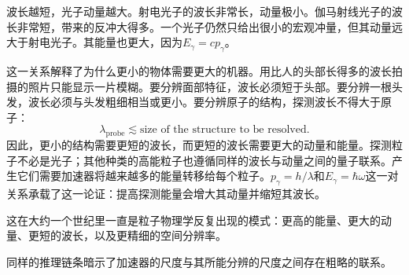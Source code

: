 \begin{classroomqa}
\end{classroomqa}

波长越短，光子动量越大。射电光子的波长非常长，动量极小。伽马射线光子的波长非常短，带来的反冲大得多。一个光子仍然只给出很小的宏观冲量，但其动量远大于射电光子。其能量也更大，因为\(E_\gamma=cp_\gamma\)。

这一关系解释了为什么更小的物体需要更大的机器。用比人的头部长得多的波长拍摄的照片只能显示一片模糊。要分辨面部特征，波长必须短于头部。要分辨一根头发，波长必须与头发粗细相当或更小。要分辨原子的结构，探测波长不得大于原子：
\begin{equation}
\lambda_{\mathrm{probe}}\lesssim
\text{size of the structure to be resolved}.
\end{equation}
因此，更小的结构需要更短的波长，而更短的波长需要更大的动量和能量。探测粒子不必是光子；其他种类的高能粒子也遵循同样的波长与动量之间的量子联系。产生它们需要加速器将越来越多的能量转移给每个粒子。\(p_\gamma=h/\lambda\)和\(E_\gamma=\hbar\omega\)这一对关系承载了这一论证：提高探测能量会增大其动量并缩短其波长。

这在大约一个世纪里一直是粒子物理学反复出现的模式：更高的能量、更大的动量、更短的波长，以及更精细的空间分辨率。

\begin{classroomqa}
\end{classroomqa}

同样的推理链条暗示了加速器的尺度与其所能分辨的尺度之间存在粗略的联系。

\begin{classroomqa}
\end{classroomqa}

